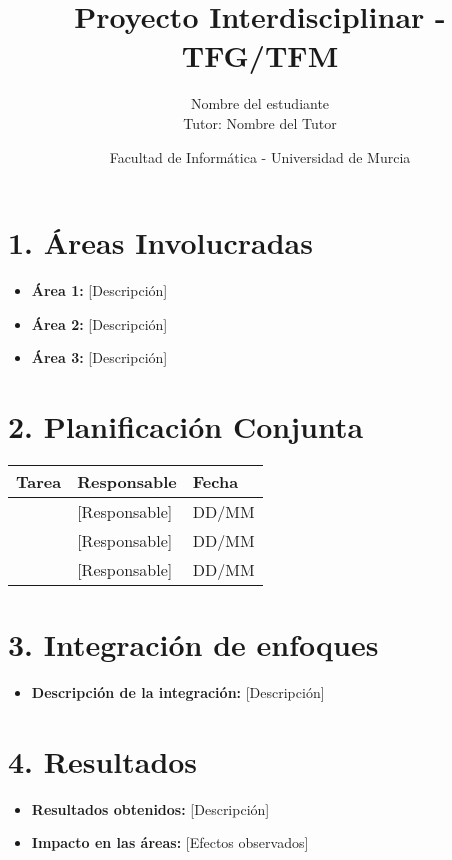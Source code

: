 \documentclass[12pt, a4paper]{article}
\title{\textbf{Proyecto Interdisciplinar - TFG/TFM}}
\author{Nombre del estudiante \\ Tutor: Nombre del Tutor}
\date{Facultad de Informática - Universidad de Murcia}
\begin{document}
\maketitle

\section*{1. Áreas Involucradas}
\begin{itemize}
    \item \textbf{Área 1:} [Descripción]
    \item \textbf{Área 2:} [Descripción]
    \item \textbf{Área 3:} [Descripción]
\end{itemize}

\section*{2. Planificación Conjunta}
\begin{tabular}{|l|l|l|}
    \hline
    \textbf{Tarea} & \textbf{Responsable} & \textbf{Fecha} \\ \hline
    [Tarea 1] & [Responsable] & DD/MM \\ \hline
    [Tarea 2] & [Responsable] & DD/MM \\ \hline
    [Tarea 3] & [Responsable] & DD/MM \\ \hline
\end{tabular}

\section*{3. Integración de enfoques}
\begin{itemize}
    \item \textbf{Descripción de la integración:} [Descripción]
\end{itemize}

\section*{4. Resultados}
\begin{itemize}
    \item \textbf{Resultados obtenidos:} [Descripción]
    \item \textbf{Impacto en las áreas:} [Efectos observados]
\end{itemize}
\end{document}
